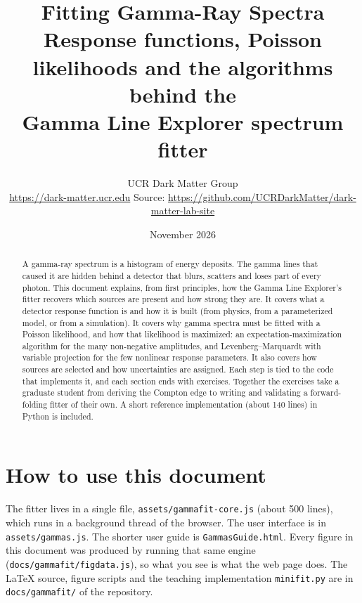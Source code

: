\documentclass[11pt]{article}
\title{\textbf{Fitting Gamma-Ray Spectra}\\[4pt]
\large Response functions, Poisson likelihoods and the algorithms behind the\\ Gamma Line Explorer spectrum fitter}
\author{UCR Dark Matter Group\\\small\url{https://dark-matter.ucr.edu} \quad Source: \url{https://github.com/UCRDarkMatter/dark-matter-lab-site}}
\date{November 2026}
\newcounter{exercise}[section]
\newcommand{\code}[1]{\texttt{#1}}
\begin{document}
\maketitle

\begin{abstract}
\noindent
A gamma-ray spectrum is a histogram of energy deposits. The gamma lines that caused it are hidden behind a detector that blurs, scatters and loses part of every photon. This document explains, from first principles, how the Gamma Line Explorer's fitter recovers which sources are present and how strong they are. It covers what a detector response function is and how it is built (from physics, from a parameterized model, or from a simulation). It covers why gamma spectra must be fitted with a Poisson likelihood, and how that likelihood is maximized: an expectation-maximization algorithm for the many non-negative amplitudes, and Levenberg--Marquardt with variable projection for the few nonlinear response parameters. It also covers how sources are selected and how uncertainties are assigned. Each step is tied to the code that implements it, and each section ends with exercises. Together the exercises take a graduate student from deriving the Compton edge to writing and validating a forward-folding fitter of their own. A short reference implementation (about 140 lines) in Python is included.
\end{abstract}

\tableofcontents
\newpage

\section{How to use this document}
The fitter lives in a single file, \code{assets/gammafit-core.js} (about 500 lines), which runs in a background thread of the browser. The user interface is in \code{assets/gammas.js}. The shorter user guide is \code{GammasGuide.html}. Every figure in this document was produced by running that same engine (\code{docs/gammafit/figdata.js}), so what you see is what the web page does. The \LaTeX{} source, figure scripts and the teaching implementation \code{minifit.py} are in \code{docs/gammafit/} of the repository.
\end{document}
